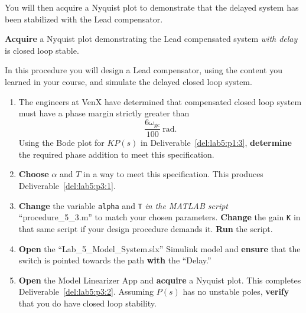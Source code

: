 %
You will then acquire a Nyquist plot to demonstrate that the delayed system has been stabilized with the Lead compensator.
%
\begin{deliverable}[label={del:lab5:p3:2}]
  \textbf{Acquire} a Nyquist plot demonstrating the Lead compensated system \emph{with delay} is closed loop stable.
\end{deliverable}
%
\begin{procedure}[label={proc:lab5:3}]
  In this procedure you will design a Lead compensator, using the content you learned in your course, and simulate the delayed closed loop system.
  \begin{enumerate}[label={(\arabic*)}]
    \item{%
      The engineers at VenX have determined that compensated closed loop system must have a phase margin strictly greater than
      \[
        \frac{6\omega_\mathrm{gc}}{100}~\mathrm{rad}.
      \]
      Using the Bode plot for \(K P(s)\) in Deliverable~\ref{del:lab5:p1:3}, \textbf{determine} the required phase addition to meet this specification.
    }
    \item{%
      \textbf{Choose} \(\alpha\) and \(T\) in a way to meet this specification.
      This produces Deliverable~\ref{del:lab5:p3:1}.
    }
    \item{%
      \textbf{Change} the variable \texttt{alpha} and \texttt{T} \emph{in the MATLAB script} ``procedure\_5\_3.m'' to match your chosen parameters.
      \textbf{Change} the gain \texttt{K} in that same script if your design procedure demands it.
      \textbf{Run} the script.
    }
    \item{%
      \textbf{Open} the ``Lab\_5\_Model\_System.slx'' Simulink model and \textbf{ensure} that the switch is pointed towards the path \textbf{with} the ``Delay.''
    }
    \item{%
      \textbf{Open} the Model Linearizer App and \textbf{acquire} a Nyquist plot.
      This completes Deliverable~\ref{del:lab5:p3:2}.
      Assuming \(P(s)\) has no unstable poles, \textbf{verify} that you do  have closed loop stability.
    }
  \end{enumerate}
\end{procedure}

